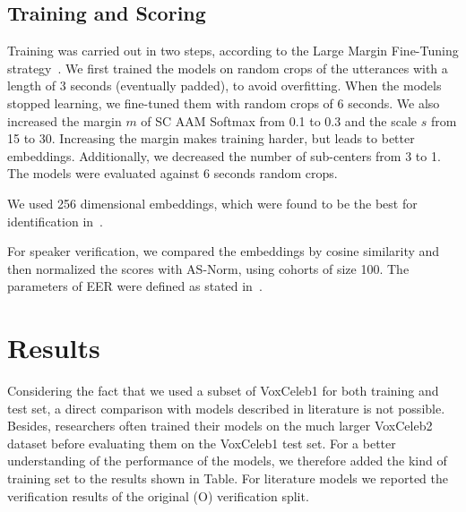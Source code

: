 \documentclass[conference]{IEEEtran}
\begin{document}
\subsection{Training and Scoring}

Training was carried out in two steps, according to the Large Margin Fine-Tuning strategy~\cite{thienpondt2021voxsrc}. We first trained the models on random crops of the utterances with a length of 3 seconds (eventually padded), to avoid overfitting. When the models stopped learning, we fine-tuned them with random crops of 6 seconds. We also increased the margin $m$ of SC AAM Softmax from 0.1 to 0.3 and the scale $s$ from 15 to 30. Increasing the margin makes training harder, but leads to better embeddings. Additionally, we decreased the number of sub-centers from 3 to 1. The models were evaluated against 6 seconds random crops.

We used 256 dimensional embeddings, which were found to be the best for identification in~\cite{hajibabaei2018unified}.

For speaker verification, we compared the embeddings by cosine similarity and then normalized the scores with AS-Norm, using cohorts of size 100. The parameters of EER were defined as stated in~\cite{nist2018}.

\section{Results}

Considering the fact that we used a subset of VoxCeleb1 for both training and test set, a direct comparison with models described in literature is not possible. Besides, researchers often trained their models on the much larger VoxCeleb2 dataset before evaluating them on the VoxCeleb1 test set. For a better understanding of the performance of the models, we therefore added the kind of training set to the results shown in Table. For literature models we reported the verification results of the original (O) verification split.
\end{document}
